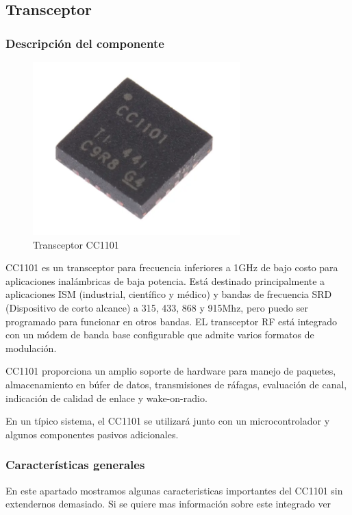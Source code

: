 \subsection{Transceptor}
\subsubsection{Descripción del componente}


\begin{figure}[htb]
	\centering
	\includegraphics[scale=0.6]{images/CC1101.png}
    \caption{Transceptor CC1101}
	\label{fig:cc1101}
\end{figure}

CC1101 es un transceptor para frecuencia inferiores a 1GHz de bajo costo para aplicaciones inalámbricas de baja potencia. Está destinado principalmente
a aplicaciones ISM (industrial, científico y médico) y bandas de frecuencia SRD (Dispositivo de corto alcance) a 315, 433, 868 y 915Mhz, pero puedo ser programado 
para funcionar en otros bandas. EL transceptor RF está integrado con un módem de banda base configurable que admite varios formatos de modulación.\par 
CC1101 proporciona un amplio soporte de hardware para manejo de paquetes, almacenamiento en búfer de datos, transmisiones de ráfagas, evaluación de canal,
indicación de calidad de enlace y wake-on-radio. \par 
En un típico sistema, el CC1101 se utilizará junto con un microcontrolador y algunos componentes pasivos adicionales.

\subsubsection{Características generales}

En este apartado mostramos algunas caracteristicas importantes del CC1101 sin extendernos demasiado. Si se quiere mas información sobre este integrado ver \todo 


